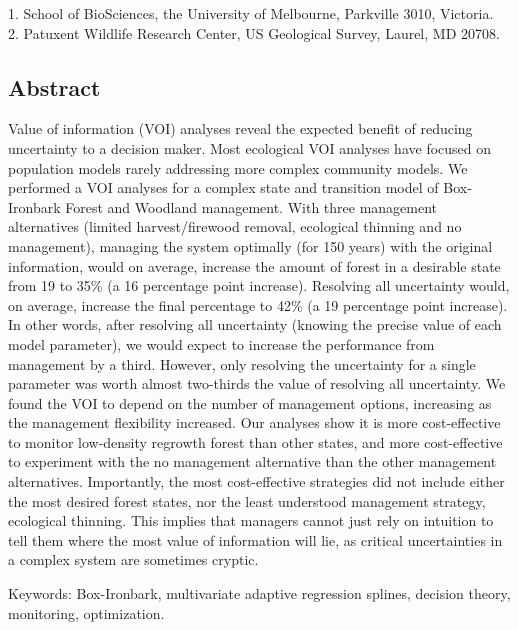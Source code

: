 1. School of BioSciences, the University of Melbourne, Parkville 3010, Victoria.\\
2. Patuxent Wildlife Research Center, US Geological Survey, Laurel, MD 20708.

\subsection*{Abstract}\label{abstract}

Value of information (VOI) analyses reveal the expected benefit of reducing uncertainty to a decision maker. Most ecological VOI analyses have focused on population models rarely addressing more complex community models. We performed a VOI analyses for a complex state and transition model of Box-Ironbark Forest and Woodland management. With three management alternatives (limited harvest/firewood removal, ecological thinning and no management), managing the system optimally (for 150 years) with the original information, would on average, increase the amount of forest in a desirable state from 19 to 35\% (a 16 percentage point increase). Resolving all uncertainty would, on average, increase the final percentage to 42\% (a 19 percentage point increase). In other words, after resolving all uncertainty (knowing the precise value of each model parameter), we would expect to increase the performance from management by a third. However, only resolving the uncertainty for a single parameter was worth almost two-thirds the value of resolving all uncertainty. We found the VOI to depend on the number of management options, increasing as the management flexibility increased. Our analyses show it is more cost-effective to monitor low-density regrowth forest than other states, and more cost-effective to experiment with the no management alternative than the other management alternatives. Importantly, the most cost-effective strategies did not include either the most desired forest states, nor the least understood management strategy, ecological thinning. This implies that managers cannot just rely on intuition to tell them where the most value of information will lie, as critical uncertainties in a complex system are sometimes cryptic.

Keywords: Box-Ironbark, multivariate adaptive regression splines, decision theory, monitoring, optimization.
